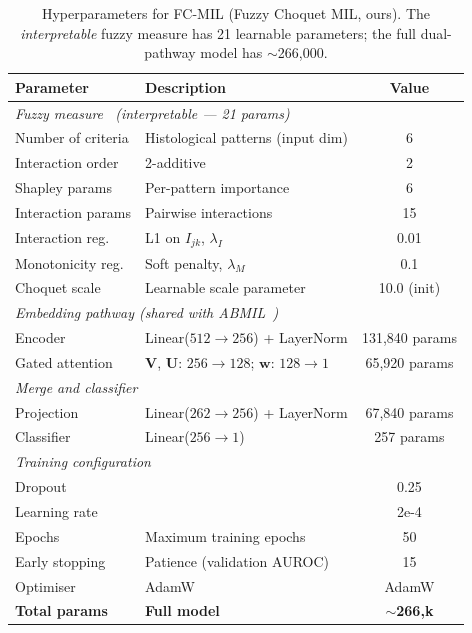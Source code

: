 \begin{table}[ht!]
\centering
\small
\caption{Hyperparameters for FC-MIL (Fuzzy Choquet MIL, ours).
The \emph{interpretable} fuzzy measure has 21 learnable parameters;
the full dual-pathway model has $\sim$266{,}000.}
\label{tab:hyper_choquet2}
\begin{tabular}{l l c}
\hline
\textbf{Parameter} & \textbf{Description} & \textbf{Value} \\
\hline
\multicolumn{3}{l}{\textit{Fuzzy measure~\cite{grabisch2009aggregation} (interpretable --- 21 params)}} \\
Number of criteria  & Histological patterns (input dim)   & 6 \\
Interaction order   & 2-additive~\cite{grabisch1997kapprox} & 2 \\
Shapley params~\cite{shapley1953value} & Per-pattern importance & 6 \\
Interaction params  & Pairwise interactions               & 15 \\
Interaction reg.    & L1 on $I_{jk}$, $\lambda_I$         & 0.01 \\
Monotonicity reg.   & Soft penalty, $\lambda_M$            & 0.1 \\
Choquet scale       & Learnable scale parameter           & 10.0 (init) \\
\hline
\multicolumn{3}{l}{\textit{Embedding pathway (shared with ABMIL~\cite{ilse2018attention})}} \\
Encoder             & Linear($512 \to 256$) + LayerNorm   & 131{,}840 params \\
Gated attention~\cite{lu2021data} & $\mathbf{V}$, $\mathbf{U}$: $256 \to 128$; $\mathbf{w}$: $128 \to 1$ & 65{,}920 params \\
\hline
\multicolumn{3}{l}{\textit{Merge and classifier}} \\
Projection          & Linear($262 \to 256$) + LayerNorm   & 67{,}840 params \\
Classifier          & Linear($256 \to 1$)                 & 257 params \\
\hline
\multicolumn{3}{l}{\textit{Training configuration}} \\
Dropout~\cite{srivastava2014dropout} &                    & 0.25 \\
Learning rate       &                                     & 2e-4 \\
Epochs              & Maximum training epochs             & 50 \\
Early stopping      & Patience (validation AUROC)         & 15 \\
Optimiser           & AdamW~\cite{loshchilov2019adamw}    & AdamW \\
\hline
\textbf{Total params} & \textbf{Full model}              & \textbf{$\sim$266{,}k} \\
\hline
\end{tabular}
\end{table}

